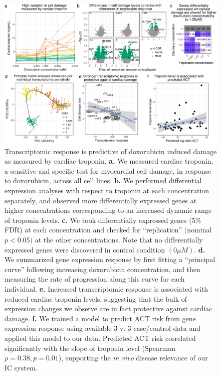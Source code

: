 \documentclass[9pt,lineno]{elife}
\begin{document}
\begin{figure}
\begin{fullwidth}
    \includegraphics[width=1\linewidth]{../figures/fig4_troponin.pdf}     \caption{Transcriptomic response is predictive of doxorubicin induced damage as measured by cardiac troponin. \textbf{a.} We measured cardiac troponin, a sensitive and specific test for myocardial cell damage, in response to doxorubicin, across all cell lines. \textbf{b.} We performed differential expression analyses with respect to troponin at each concentration separately, and observed more differentially expressed genes at higher concentrations corresponding to an increased dynamic range of troponin levels. \textbf{c.} We took differentially expressed genes (5\% FDR) at each concentration and checked for ``replication'' $($nominal $p<0.05)$ at the other concentrations. Note that no differentially expressed genes were discovered in control condition $(0 \mu M)$. \textbf{d.} We summarized gene expression response by first fitting a ``principal curve'' following increasing doxorubicin concentration, and then measuring the rate of progression along this curve for each individual. \textbf{e.} Increased transcriptomic response is associated with reduced cardiac troponin levels, suggesting that the bulk of expression changes we observe are in fact protective against cardiac damage. \textbf{f.} We trained a model to predict ACT risk from gene expression response using available 3 v. 3 case/control data \citep{Burridge2016} and applied this model to our data. Predicted ACT risk correlated significantly with the slope of troponin level (Spearman $\rho=0.38, p=0.01$), supporting the \emph{in vivo} disease relevance of our IC system. }
    \label{fig:troponin}
    \end{fullwidth}
\end{figure}
\end{document}
